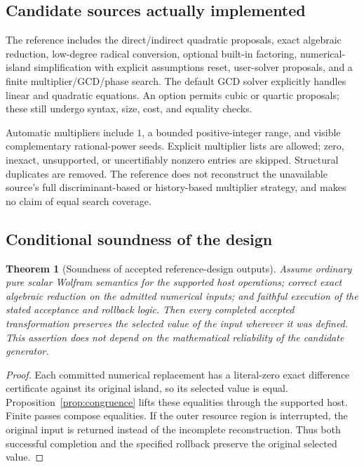 \documentclass[11pt,letterpaper]{article}
\numberwithin{equation}{section}
\newtheorem{theorem}{Theorem}[section]
\theoremstyle{definition}\newtheorem{definition}[theorem]{Definition}
\theoremstyle{remark}\newtheorem{remark}[theorem]{Remark}
\newcommand{\code}[1]{\texttt{\detokenize{#1}}}
\begin{document}
\subsection{Candidate sources actually implemented}
The reference includes the direct/indirect quadratic proposals, exact algebraic reduction, low-degree radical conversion, optional built-in factoring, numerical-island simplification with explicit assumptions reset, user-solver proposals, and a finite multiplier/GCD/phase search. The default GCD solver explicitly handles linear and quadratic equations. An option permits cubic or quartic \code{Solve} proposals; these still undergo syntax, size, cost, and equality checks.

Automatic multipliers include $1$, a bounded positive-integer range, and visible complementary rational-power seeds. Explicit multiplier lists are allowed; zero, inexact, unsupported, or uncertifiably nonzero entries are skipped. Structural duplicates are removed. The reference does not reconstruct the unavailable source's full discriminant-based or history-based multiplier strategy, and makes no claim of equal search coverage.

\subsection{Conditional soundness of the design}
\begin{theorem}[Soundness of accepted reference-design outputs]\label{thm:soundness}
Assume ordinary pure scalar Wolfram semantics for the supported host operations; correct exact algebraic reduction on the admitted numerical inputs; and faithful execution of the stated acceptance and rollback logic. Then every completed accepted transformation preserves the selected value of the input wherever it was defined. This assertion does not depend on the mathematical reliability of the candidate generator.
\end{theorem}
\begin{proof}
Each committed numerical replacement has a literal-zero exact difference certificate against its original island, so its selected value is equal. Proposition~\ref{prop:congruence} lifts these equalities through the supported host. Finite passes compose equalities. If the outer resource region is interrupted, the original input is returned instead of the incomplete reconstruction. Thus both successful completion and the specified rollback preserve the original selected value.
\end{proof}
\end{document}
